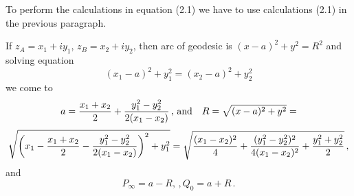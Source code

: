 To  perform the calculations in equation (2.1)
we have to use calculations (2.1) in the previous paragraph.

If 
   $z_A=x_1+iy_1$,
   $z_B=x_2+iy_2$,
   then arc of geodesic is
     $(x-a)^2+y^2=R^2$ and solving equation
        $$
  (x_1-a)^2+y_1^2=
  (x_2-a)^2+y_2^2
        $$
we come to
          $$
     a={x_1+x_2\over 2}+
     {y_1^2-y_2^2\over 2(x_1-x_2)}\,,\,
{\rm and}\quad
     R=\sqrt{(x-a)^2+y^2}=
           $$
           $$
      \sqrt
         {
      \left(
x_1-{x_1+x_2\over 2}-
     {y_1^2-y_2^2\over 2(x_1-x_2)}
       \right)^2+y_1^2
}
       =
      \sqrt
            {
             {
   (x_1-x_2)^2\over 4
           }+
      {(y_1^2-y_2^2)^2\over 4(x_1-x_2)^2}
          +{y_1^2+y_2^2\over 2}
            }\,,
          $$
and
        $$
P_\infty=a-R, \,,  Q_0=a+R\,.
       $$


\bye
